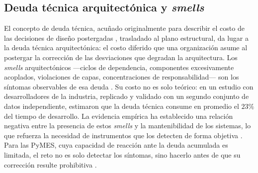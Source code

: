 \subsection{Deuda técnica arquitectónica y \textit{smells}}
El concepto de deuda técnica, acuñado originalmente para describir el costo de las decisiones de diseño postergadas \citep{Cunningham1992}, trasladado al plano estructural, da lugar a la deuda técnica arquitectónica: el costo diferido que una organización asume al postergar la corrección de las desviaciones que degradan la arquitectura. Los \textit{smells} arquitectónicos —ciclos de dependencia, componentes excesivamente acoplados, violaciones de capas, concentraciones de responsabilidad— son los síntomas observables de esa deuda \citep{SasAvgeriou, ArcelliFontana2016}. Su costo no es solo teórico: en un estudio con desarrolladores de la industria, replicado y validado con un segundo conjunto de datos independiente, \citet{Besker2019} estimaron que la deuda técnica consume en promedio el $23\%$ del tiempo de desarrollo. La evidencia empírica ha establecido una relación negativa entre la presencia de estos \textit{smells} y la mantenibilidad de los sistemas, lo que refuerza la necesidad de instrumentos que los detecten de forma objetiva \citep{Jolak2025, Sas2019}. Para las PyMES, cuya capacidad de reacción ante la deuda acumulada es limitada, el reto no es solo detectar los síntomas, sino hacerlo antes de que su corrección resulte prohibitiva \citep{Hamed2023}.

